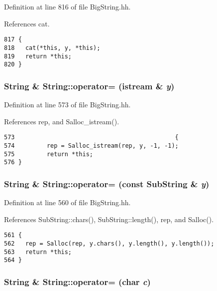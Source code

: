 Definition at line 816 of file Big\-String.hh.

References cat.



\footnotesize\begin{verbatim}817 {
818   cat(*this, y, *this);
819   return *this;
820 }
\end{verbatim}\normalsize 
{}
\subsubsection{\setlength{\rightskip}{0pt plus 5cm}String \& String::operator= (istream \& {\em y})\hspace{0.3cm}{\tt  [inline]}}\label{classString_a14}




Definition at line 573 of file Big\-String.hh.

References rep, and Salloc\_\-istream().



\footnotesize\begin{verbatim}573                                             {
574         rep = Salloc_istream(rep, y, -1, -1);
575         return *this;
576 }
\end{verbatim}\normalsize 
{}
\subsubsection{\setlength{\rightskip}{0pt plus 5cm}String \& String::operator= (const {\bf Sub\-String} \& {\em y})\hspace{0.3cm}{\tt  [inline]}}\label{classString_a13}




Definition at line 560 of file Big\-String.hh.

References Sub\-String::chars(), Sub\-String::length(), rep, and Salloc().



\footnotesize\begin{verbatim}561 {
562   rep = Salloc(rep, y.chars(), y.length(), y.length());
563   return *this;
564 }
\end{verbatim}\normalsize 
{}
\subsubsection{\setlength{\rightskip}{0pt plus 5cm}String \& String::operator= (char {\em c})\hspace{0.3cm}{\tt  [inline]}}\label{classString_a12}




